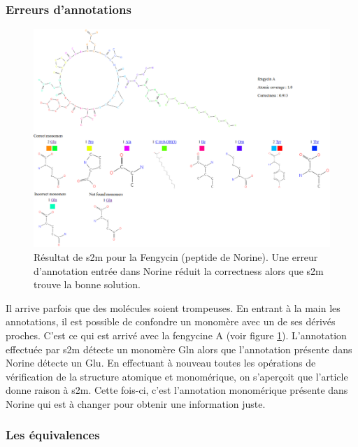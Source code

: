 \subsubsection{Erreurs d'annotations}

\begin{figure}[h!]
  \begin{center}
    \includegraphics[width=450px]{Figures/s2m/results/fengycin.png}
    \caption{\label{fengycin}Résultat de s2m pour la Fengycin (peptide de Norine).
    Une erreur d'annotation entrée dans Norine réduit la correctness alors que s2m trouve la bonne solution.}
  \end{center}
\end{figure}

Il arrive parfois que des molécules soient trompeuses.
En entrant à la main les annotations, il est possible de confondre un monomère avec un de ses dérivés proches.
C'est ce qui est arrivé avec la fengycine A (voir figure \ref{fengycin}).
L'annotation effectuée par s2m détecte un monomère Gln alors que l'annotation présente dans Norine détecte un Glu.
En effectuant à nouveau toutes les opérations de vérification de la structure atomique et monomérique, on s'aperçoit que l'article~\cite{wu_nonribosomal_2007} donne raison à s2m.
Cette fois-ci, c'est l'annotation monomérique présente dans Norine qui est à changer pour obtenir une information juste.


\subsubsection{Les équivalences}

